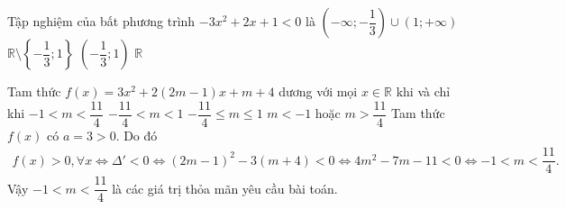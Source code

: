 \begin{ex}%
	Tập nghiệm của bất phương trình $-3x^2+2x+1<0$ là
	\choice
	{\True $\left(-\infty;-\dfrac{1}{3}\right)\cup \left(1;+\infty\right)$}
	{$\mathbb{R} \setminus \left\{-\dfrac{1}{3};1\right\}$}
	{$\left(-\dfrac{1}{3};1\right)$}
	{$\mathbb{R}$}
\end{ex}

\begin{ex}%
	Tam thức $f(x)=3x^2+2(2m-1)x+m+4$ dương với mọi $x \in \mathbb{R}$ khi và chỉ khi
	\choice
	{\True $-1<m<\dfrac{11}{4}$}
	{$-\dfrac{11}{4}<m<1$}
	{$-\dfrac{11}{4}\le m\le 1$}
	{$m<-1$ hoặc $m>\dfrac{11}{4}$}
	\loigiai
	{
		Tam thức $f(x)$ có $a=3>0$. Do đó
		\begin{eqnarray*}
			f(x)>0,\forall x \Leftrightarrow \Delta'<0 \Leftrightarrow (2m-1)^2-3(m+4)<0 \Leftrightarrow 4m^2-7m-11<0 \Leftrightarrow -1<m<\dfrac{11}{4}.
		\end{eqnarray*}
		Vậy $-1<m<\dfrac{11}{4}$ là các giá trị thỏa mãn yêu cầu bài toán.
	}
\end{ex}

